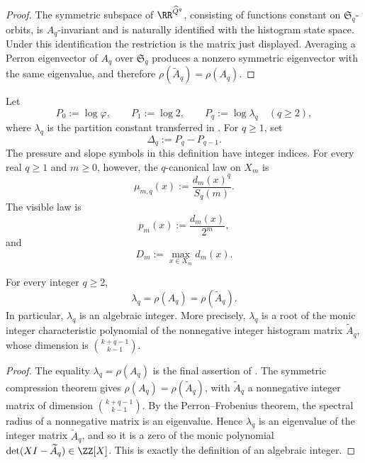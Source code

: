 \begin{proof}
The symmetric subspace of \(\RR^{\widehat Q^q}\), consisting of functions
constant on \(\mathfrak S_q\)-orbits, is \(A_q\)-invariant and is naturally
identified with the histogram state space.  Under this identification the
restriction is the matrix just displayed.  Averaging a Perron eigenvector of
\(A_q\) over \(\mathfrak S_q\) produces a nonzero symmetric eigenvector with
the same eigenvalue, and therefore \(\rho(\widetilde A_q)=\rho(A_q)\).
\end{proof}

\begin{definition}
\label{def:pressure-slopes}
Let
\[
  P_0:=\log\varphi,\qquad P_1:=\log2,\qquad
  P_q:=\log\lambda_q\quad(q\ge2),
\]
where \(\lambda_q\) is the partition constant transferred in
.  For \(q\ge1\), set
\[
  \Delta_q:=P_q-P_{q-1}.
\]
The pressure and slope symbols in this definition have integer indices.  For
every real \(q\ge1\) and \(m\ge0\), however, the \(q\)-canonical law on
\(X_m\) is
\[
  \mu_{m,q}(x):=\frac{d_m(x)^q}{S_q(m)}.
\]
The visible law is
\[
  p_m(x):=\frac{d_m(x)}{2^m},
\]
and
\[
  D_m:=\max_{x\in X_m}d_m(x).
\]
\end{definition}

\begin{corollary}
\label{cor:lambda-algebraic}
For every integer \(q\ge 2\),
\[
  \lambda_q=\rho(A_q)=\rho(\widetilde A_q).
\]
In particular, \(\lambda_q\) is an algebraic integer.  More precisely,
\(\lambda_q\) is a root of the monic integer characteristic polynomial of the
nonnegative integer histogram matrix \(\widetilde A_q\), whose dimension is
\(\binom{k+q-1}{k-1}\).
\end{corollary}

\begin{proof}
The equality \(\lambda_q=\rho(A_q)\) is the final assertion of
.  The symmetric compression theorem gives
\(\rho(A_q)=\rho(\widetilde A_q)\), with \(\widetilde A_q\) a nonnegative
integer matrix of dimension \(\binom{k+q-1}{k-1}\).  By the
Perron--Frobenius theorem, the spectral radius of a nonnegative matrix is an
eigenvalue.  Hence \(\lambda_q\) is an eigenvalue of the integer matrix
\(\widetilde A_q\), and so it is a zero of the monic polynomial
\(\det(XI-\widetilde A_q)\in\ZZ[X]\).  This is exactly the definition of an
algebraic integer.
\end{proof}

